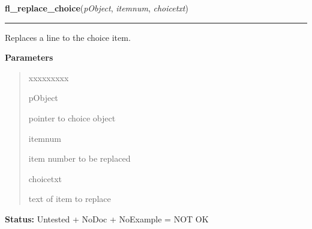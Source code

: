 \hspace{.8\funcindent}\begin{boxedminipage}{\funcwidth}

    \raggedright \textbf{fl\_replace\_choice}(\textit{pObject}, \textit{itemnum}, \textit{choicetxt})

    \vspace{-1.5ex}

    \rule{\textwidth}{0.5\fboxrule}
\setlength{\parskip}{2ex}
    Replaces a line to the choice item.

\setlength{\parskip}{1ex}
      \textbf{Parameters}
      \vspace{-1ex}

      \begin{quote}
        \begin{Ventry}{xxxxxxxxx}

          \item[pObject]

          pointer to choice object

          \item[itemnum]

          item number to be replaced

          \item[choicetxt]

          text of item to replace

        \end{Ventry}

      \end{quote}

\textbf{Status:} Untested + NoDoc + NoExample = NOT OK



    \end{boxedminipage}

    \label{xformslib:library:fl_delete_choice}

    \vspace{0.5ex}

